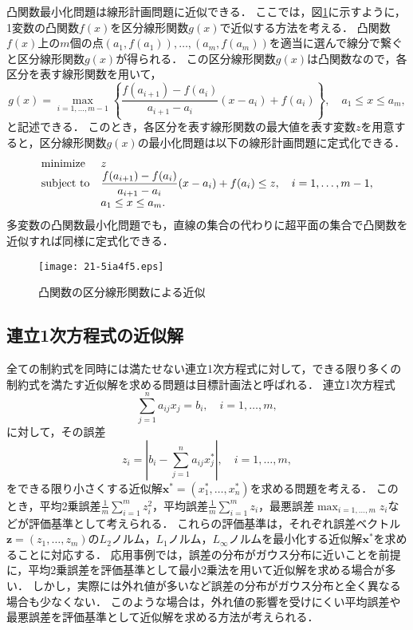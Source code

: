 \documentclass[japanese]{jnlp_1.4}
\begin{document}
凸関数最小化問題は線形計画問題に近似できる．
ここでは，図\ref{fig:nonlinear1}に示すように，1変数の凸関数$f(x)$を区分線形関数$g(x)$で近似する方法を考える．
凸関数$f(x)$上の$m$個の点$(a_1,f(a_1)),\allowbreak \dots, \allowbreak (a_m,f(a_m))$を適当に選んで線分で繋ぐと区分線形関数$g(x)$が得られる．
この区分線形関数$g(x)$は凸関数なので，各区分を表す線形関数を用いて，
\begin{equation}
g(x) = \max_{i=1,\dots,m-1} \left\{ \displaystyle\frac{f(a_{i+1}) - f(a_i)}{a_{i+1} - a_i}(x - a_i) + f(a_i) \right\}, \quad a_1 \le x \le a_m,
\end{equation}
と記述できる．
このとき，各区分を表す線形関数の最大値を表す変数$z$を用意すると，区分線形関数$g(x)$の最小化問題は以下の線形計画問題に定式化できる．
\begin{equation}
\label{eq:nonlinear1}
\begin{array}{ll}
\textnormal{minimize} & z\\
\textnormal{subject to} & \displaystyle\frac{f(a_{i+1}) - f(a_i)}{a_{i+1} - a_i}(x - a_i) + f(a_i) \le z, \quad i=1,\dots,m-1,\\
 & a_1 \le x \le a_m.
\end{array}
\end{equation}
多変数の凸関数最小化問題でも，直線の集合の代わりに超平面の集合で凸関数を近似すれば同様に定式化できる．

\begin{figure}[b]
\begin{center}
\texttt{[image: 21-5ia4f5.eps]}
\end{center}
\caption{凸関数の区分線形関数による近似}
\label{fig:nonlinear1}
\end{figure}


\subsection{連立1次方程式の近似解}
\label{sec:linear-equations}

全ての制約式を同時には満たせない連立1次方程式に対して，できる限り多くの制約式を満たす近似解を求める問題は目標計画法と呼ばれる\cite{CharnesA1961}．
連立1次方程式
\begin{equation}
\sum_{j=1}^n a_{ij} x_j = b_i, \quad i=1,\dots,m,
\end{equation}
に対して，その誤差
\begin{equation}
z_i = \left| b_i - \sum_{j=1}^n a_{ij} x_j^{\ast} \right|, \quad i=1,\dots,m,
\end{equation}
をできる限り小さくする近似解$\bm{x}^{\ast} = (x_1^{\ast},\dots,x_n^{\ast})$を求める問題を考える．
このとき，平均2乗誤差$\frac{1}{m}\sum_{i=1}^m z_i^2$，平均誤差$\frac{1}{m}\sum_{i=1}^m z_i$，最悪誤差$\max_{i=1,\dots,m} z_i$などが評価基準として考えられる．
これらの評価基準は，それぞれ誤差ベクトル$\bm{z} = (z_1,\dots,z_m)$の$L_2$ノルム，$L_1$ノルム，$L_\infty$ノルムを最小化する近似解$\bm{x}^{\ast}$を求めることに対応する．
応用事例では，誤差の分布がガウス分布に近いことを前提に，平均2乗誤差を評価基準として最小2乗法を用いて近似解を求める場合が多い．
しかし，実際には外れ値が多いなど誤差の分布がガウス分布と全く異なる場合も少なくない．
このような場合は，外れ値の影響を受けにくい平均誤差や最悪誤差を評価基準として近似解を求める方法が考えられる．
\end{document}
